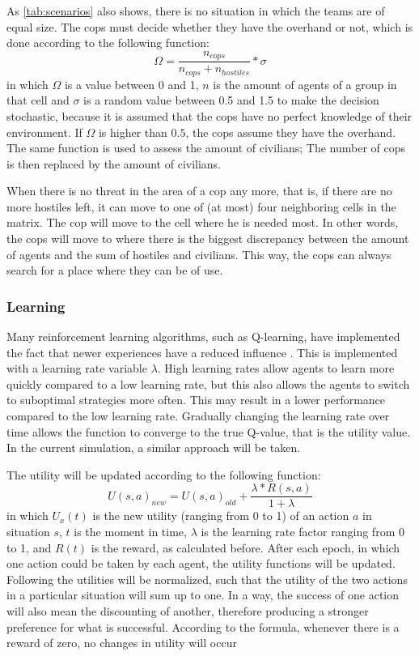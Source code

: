 As \autoref{tab:scenarios} also shows, there is no situation in which the teams are of equal size. The cops must decide whether they have the overhand or not, which is done according to the following function:
$$ \Omega = \frac{n_{cops}}{n_{cops} + n_{hostiles}}*\sigma $$
in which $\Omega$ is a value between 0 and 1, $n$ is the amount of agents of a group in that cell and $\sigma$ is a random value between 0.5 and 1.5 to make the decision stochastic, because it is assumed that the cops have no perfect knowledge of their environment. If $\Omega$ is higher than $0.5$, the cops assume they have the overhand. The same function is used to assess the amount of civilians; The number of cops is then replaced by the amount of civilians. 

When there is no threat in the area of a cop any more, that is, if there are no more hostiles left, it can move to one of (at most) four neighboring cells in the matrix. The cop will move to the cell where he is needed most. In other words, the cops will move to where there is the biggest discrepancy between the amount of agents and the sum of hostiles and civilians. This way, the cops can always search for a place where they can be of use. 

\subsubsection{Learning}
Many reinforcement learning algorithms, such as Q-learning, have implemented the fact that newer experiences have a reduced influence  \citep*{watkins1992q}. This is implemented with a learning rate variable $\lambda$. High learning rates allow agents to learn more quickly compared to a low learning rate, but this also allows the agents to switch to suboptimal strategies more often. This may result in a lower performance compared to the low learning rate. Gradually changing the learning rate over time allows the function to converge to the true Q-value, that is the utility value. In the current simulation, a similar approach will be taken. 

The utility will be updated according to the following function:
$$ U(s,a)_{new} = U(s,a)_{old} + \frac{\lambda * R(s,a)}{1+\lambda} $$
in which $U_x(t)$ is the new utility (ranging from 0 to 1) of an action $a$ in situation $s$, $t$ is the moment in time, $\lambda$ is the learning rate factor ranging from 0 to 1, and $R(t)$ is the reward, as calculated before. After each epoch, in which one action could be taken by each agent, the utility functions will be updated. Following the utilities will be normalized, such that the utility of the two actions in a particular situation will sum up to one. In a way, the success of one action will also mean the discounting of another, therefore producing a stronger preference for what is successful. According to the formula, whenever there is a reward of zero, no changes in utility will occur

